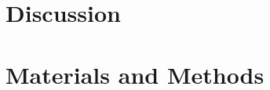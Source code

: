 \documentclass[10pt]{article}
\newcommand{\hmic}{{IC}$_{50}$}
\newcommand{\idepi}{{IDEPI}}
\newcommand{\mrmr}{{mRMR}}
\newcommand{\svm}{{SVM}}
\begin{document}
%
%

\section*{Discussion}




\section*{Materials and Methods}
\end{document}
